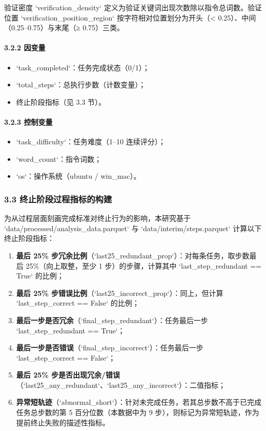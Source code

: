 \documentclass[12pt,a4paper,openany,oneside]{ctexrep}
\begin{document}
验证密度 `verification\_density` 定义为验证关键词出现次数除以指令总词数。验证位置 `verification\_position\_region` 按字符相对位置划分为开头（< 0.25）、中间（0.25–0.75）与末尾（≥ 0.75）三类。

\paragraph{3.2.2 因变量}


\begin{itemize}
\item `task\_completed`：任务完成状态（0/1）；
\item `total\_steps`：总执行步数（计数变量）；
\item 终止阶段指标（见 3.3 节）。
\end{itemize}


\paragraph{3.2.3 控制变量}


\begin{itemize}
\item `task\_difficulty`：任务难度（1–10 连续评分）；
\item `word\_count`：指令词数；
\item `os`：操作系统（ubuntu / win\_mac）。
\end{itemize}


\subsubsection{3.3 终止阶段过程指标的构建}


为从过程层面刻画完成标准对终止行为的影响，本研究基于 `data/processed/analysis\_data.parquet` 与 `data/interim/steps.parquet` 计算以下终止阶段指标：

\begin{enumerate}
\item[1.] \textbf{最后 25\% 步冗余比例}（`last25\_redundant\_prop`）：对每条任务，取步数最后 25\%（向上取整，至少 1 步）的步骤，计算其中 `last\_step\_redundant == True` 的比例；
\item[2.] \textbf{最后 25\% 步错误比例}（`last25\_incorrect\_prop`）：同上，但计算 `last\_step\_correct == False` 的比例；
\item[3.] \textbf{最后一步是否冗余}（`final\_step\_redundant`）：任务最后一步 `last\_step\_redundant == True`；
\item[4.] \textbf{最后一步是否错误}（`final\_step\_incorrect`）：任务最后一步 `last\_step\_correct == False`；
\item[5.] \textbf{最后 25\% 步是否出现冗余/错误}（`last25\_any\_redundant`、`last25\_any\_incorrect`）：二值指标；
\item[6.] \textbf{异常短轨迹}（`abnormal\_short`）：针对未完成任务，若其总步数不高于已完成任务总步数的第 5 百分位数（本数据中为 9 步），则标记为异常短轨迹，作为提前终止失败的描述性指标。
\end{enumerate}
\end{document}
